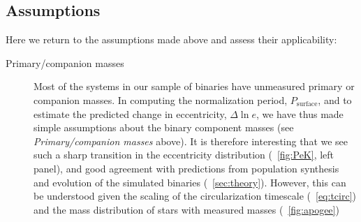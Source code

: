 \documentclass[modern, letterpaper]{aastex62}
\newcommand{\Psurf}{\ensuremath{P_\textrm{surface}}}
\begin{document}
\subsection{Assumptions}

Here we return to the assumptions made above and assess their applicability:
\begin{description}
    \item[Primary/companion masses] Most of the systems in our sample of
    binaries have unmeasured primary or companion masses.
    In computing the normalization period, \Psurf, and to estimate the predicted
    change in eccentricity, $\Delta \ln e$, we have thus made simple assumptions
    about the binary component masses (see \emph{Primary/companion masses}
    above).
    It is therefore interesting that we see such a sharp transition in the
    eccentricity distribution (\figurename~\ref{fig:PeK}, left panel), and good
    agreement with predictions from population synthesis and evolution of the
    simulated binaries (\sectionname~\ref{sec:theory}).
    However, this can be understood given the scaling of the circularization
    timescale (\eqname~\ref{eq:tcirc}) and the mass distribution of stars with
    measured masses (\figurename~\ref{fig:apogee})


\end{description}
\end{document}
